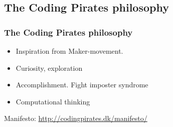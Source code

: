 \documentclass{beamer}
\begin{document}
\subsection{The Coding Pirates philosophy}
\begin{frame}
\frametitle{The Coding Pirates philosophy}

\begin{itemize}
\item Inspiration from Maker-movement. 
\item Curiosity, exploration
\item Accomplishment. Fight imposter syndrome
\item Computational thinking
\end{itemize}

Manifesto: \url{http://codingpirates.dk/manifesto/}


\end{frame}
\end{document}
